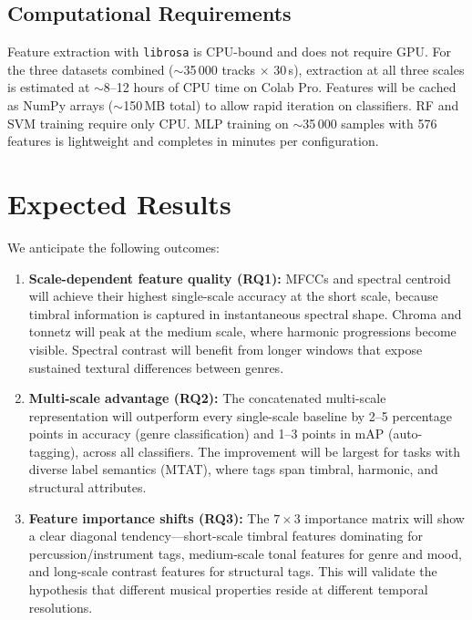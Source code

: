 \documentclass[conference]{IEEEtran}
\begin{document}
\subsection{Computational Requirements}

Feature extraction with \texttt{librosa} is CPU-bound and does not require GPU.
For the three datasets combined ($\sim$35\,000 tracks $\times$ 30\,s), extraction at all three scales is estimated at $\sim$8--12 hours of CPU time on Colab Pro.
Features will be cached as NumPy arrays ($\sim$150\,MB total) to allow rapid iteration on classifiers.
RF and SVM training require only CPU.
MLP training on $\sim$35\,000 samples with 576 features is lightweight and completes in minutes per configuration.

\section{Expected Results}

We anticipate the following outcomes:

\begin{enumerate}
    \item \textbf{Scale-dependent feature quality (RQ1):} MFCCs and spectral centroid will achieve their highest single-scale accuracy at the short scale, because timbral information is captured in instantaneous spectral shape. Chroma and tonnetz will peak at the medium scale, where harmonic progressions become visible. Spectral contrast will benefit from longer windows that expose sustained textural differences between genres.

    \item \textbf{Multi-scale advantage (RQ2):} The concatenated multi-scale representation will outperform every single-scale baseline by 2--5 percentage points in accuracy (genre classification) and 1--3 points in mAP (auto-tagging), across all classifiers. The improvement will be largest for tasks with diverse label semantics (MTAT), where tags span timbral, harmonic, and structural attributes.

    \item \textbf{Feature importance shifts (RQ3):} The $7 \times 3$ importance matrix will show a clear diagonal tendency---short-scale timbral features dominating for percussion/instrument tags, medium-scale tonal features for genre and mood, and long-scale contrast features for structural tags. This will validate the hypothesis that different musical properties reside at different temporal resolutions.
\end{enumerate}
\end{document}
